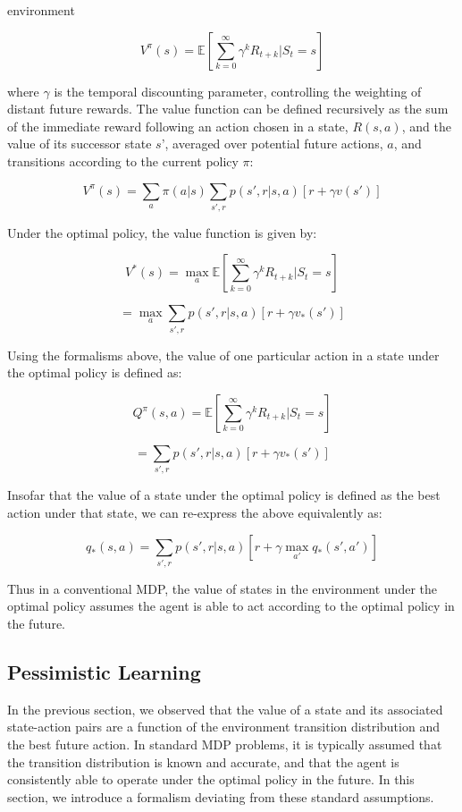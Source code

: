 environment\documentclass[11pt]{article} %
\begin{document}
$$ V^\pi(s) = \mathbb{E} \left[ \sum^{\infty}_{k=0} \gamma^k R_{t+k} | S_t = s \right] $$

where $\gamma$ is the temporal discounting parameter, controlling the weighting
of distant future rewards. The value function can be defined recursively as the
sum of the immediate reward following an action chosen in a state, $R(s, a)$, and
the value of its successor state $s’$, averaged over potential future actions, $a$,
and transitions according to the current policy $\pi$:

$$ V^\pi(s) = \sum_a \pi(a|s) \sum_{s',r}p(s',r|s,a) \left[ r + \gamma v(s') \right] $$

Under the optimal policy, the value function is given by:

$$ V^*(s) = \max_a \mathbb{E} \left[ \sum^{\infty}_{k=0} \gamma^k R_{t+k} | S_t = s \right] $$

$$ = \max_a \sum_{s',r}p(s',r|s,a) \left[ r + \gamma v_*(s') \right] $$

Using the formalisms above, the value of one particular action in a state under
the optimal policy is defined as:

$$ Q^\pi(s,a) = \mathbb{E} \left[ \sum^{\infty}_{k=0} \gamma^k R_{t+k} | S_t = s \right] $$

$$ = \sum_{s',r}p(s',r|s,a) \left[ r + \gamma v_*(s') \right] $$

Insofar that the value of a state under the optimal policy is defined as the best
action under that state, we can re-express the above equivalently as:

$$ q_*(s,a) = \sum_{s',r}p(s',r|s,a) \left[ r + \gamma \max_{a'} q_*(s',a') \right] $$

Thus in a conventional MDP, the value of states in the environment under the optimal
policy assumes the agent is able to act according to the optimal policy in the future.

\subsection{Pessimistic Learning}

In the previous section, we observed that the value of a state and its associated
state-action pairs are a function of the environment transition distribution and
the best future action. In standard MDP problems, it is typically assumed that the
transition distribution is known and accurate, and that the agent is consistently
able to operate under the optimal policy in the future. In this section, we introduce
a formalism deviating from these standard assumptions.
\end{document}
